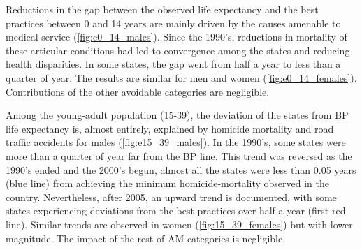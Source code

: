 \documentclass{article}
\begin{document}
\begin{spacing}{1.5}
Reductions in the gap between the observed life expectancy and the best practices between 0 and 14 years are mainly driven by the causes amenable to medical service (\ref{fig:e0_14_males}). Since the 1990's, reductions in mortality of these articular conditions had led to convergence among the states and reducing health disparities. In some states, the gap went from half a year to less than a quarter of year. The results are similar for men and women (\ref{fig:e0_14_females}). Contributions of the other avoidable categories are negligible. 

Among the young-adult population (15-39), the deviation of the states from BP life expectancy is, almost entirely, explained by homicide mortality and road traffic accidents for males (\ref{fig:e15_39_males}). In the 1990's, some states were more than a quarter of year far from the BP line. This trend was reversed as the 1990's ended and the 2000's begun, almost all the states were less than 0.05 years (blue line) from achieving the minimum homicide-mortality observed in the country. Nevertheless, after 2005, an upward trend is documented, with some states experiencing deviations from the best practices over half a year (first red line). Similar trends are observed in women (\ref{fig:15_39_females}) but with lower magnitude. The impact of the rest of AM categories is negligible. 



\end{spacing}
\end{document}
